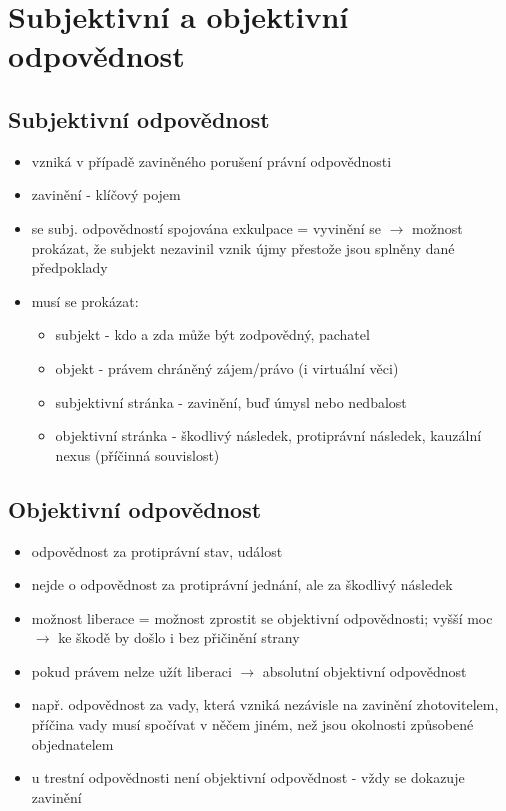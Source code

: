 \clearpage
\section{Subjektivní a objektivní odpovědnost}
\subsection*{Subjektivní odpovědnost}
\begin{itemize}
    \item vzniká v případě zaviněného porušení právní odpovědnosti
    \item zavinění - klíčový pojem
    \item se subj. odpovědností spojována exkulpace = vyvinění se $\longrightarrow$ možnost prokázat, že subjekt nezavinil vznik újmy přestože jsou splněny dané předpoklady
    \item musí se prokázat:
    \begin{itemize}
        \item subjekt - kdo a zda může být zodpovědný, pachatel
        \item objekt - právem chráněný zájem/právo (i virtuální věci)
        \item subjektivní stránka - zavinění, buď úmysl nebo nedbalost
        \item objektivní stránka - škodlivý následek, protiprávní následek, kauzální nexus (příčinná souvislost)
    \end{itemize}
\end{itemize}

\subsection*{Objektivní odpovědnost}
\begin{itemize}
    \item odpovědnost za protiprávní stav, událost
    \item nejde o odpovědnost za protiprávní jednání, ale za škodlivý následek
    \item možnost liberace = možnost zprostit se objektivní odpovědnosti; vyšší moc $\longrightarrow$ ke škodě by došlo i bez přičinění strany 
    \item pokud právem nelze  užít liberaci $\longrightarrow$ absolutní objektivní odpovědnost
    \item např. odpovědnost za vady, která vzniká nezávisle na zavinění zhotovitelem, příčina vady musí spočívat v něčem jiném, než jsou okolnosti způsobené objednatelem
    \item  u trestní odpovědnosti není objektivní odpovědnost - vždy se dokazuje zavinění 
\end{itemize} 

